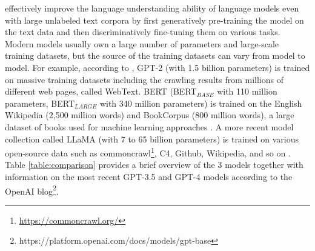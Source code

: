 \documentclass[runningheads]{llncs}
\begin{document}
effectively improve the language understanding ability of language models even with large unlabeled text corpora by first generatively pre-training the model on the text data and then discriminatively fine-tuning them on various tasks.
Modern models usually own a large number of parameters and large-scale training datasets, but the source of the training datasets can vary from model to model. For example, 
according to \cite{Radford19}, GPT-2 (with 1.5 billion parameters) is trained on massive training datasets including the crawling results from millions of different web pages, called WebText. BERT (BERT$_{BASE}$ with 110 million
parameters, BERT$_{LARGE}$ with 340 million parameters) is trained on the English Wikipedia (2,500 million words) and BookCorpus (800 million words), a large dataset of books used for machine learning approaches \cite{Devlin18}. 
A more recent model collection called LLaMA (with 7 to 65 billion parameters) is trained on various open-source data such as commoncrawl\footnote{\url{https://commoncrawl.org/}}, C4, Github, Wikipedia, and so on \cite{Touvron23}. 
Table \ref{table:comparison} provides a brief overview of the 3 models together with information on the most recent GPT-3.5 and GPT-4 models according to the OpenAI blog\footnote{https://platform.openai.com/docs/models/gpt-base}. \\
\end{document}
